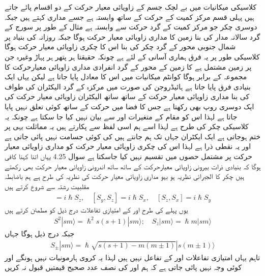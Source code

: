 کلاسیکی میکانیات میں بے لچک جسم کے زاویائی معیار حرکت کے دو اقسام پائے جاتے ہیں پہلی قسم مرکز کمیت کے حرکت کے ساتھ وابستہ ہے جسے مداری  کہتے ہیں جبکہ دوسری چکر  جو مرکز کمیت کے گرد حرکت سے وابستہ ہے مثال کے طور پر سورج کے گرد سالانہ مدار کی بنا زمین کا مداری زاویائی معیار حرکت ہوگا جبکہ روزانہ کی بنیاد پر شمال جنوبی محور کے گرد چکر کی بنا اس کا چکری زاویائی معیار حرکت ہوگا کلاسیکی طور پر یہ فرق ہماری آسانی کے لئے ہے چونکہ حقیقتا ہر پتھر ہر پہاڑ وغیرہ جن پر زمین مشتمل ہے کا زمین کے محور کے گرد انفرادی مداری زاویائی معیارحرکت کا مجموعہ  کے برابر ہوگا کوانٹم میکانیات میں اس کا معادل پایا جاتا ہے لیکن یہاں ایک بنیادی فرق پایا جاتا ہے ہائیڈروجن کی صورت میں مرکزہ کے گرد الیکٹران کی طواف کی بنا مداری زاویائی معیار حرکت کے ساتھ ساتھ الیکٹران زاویائی معیار حرکت کی ایک دوسری روپ بھی رکھتا ہے جس کا فضا میں حرکت کے ساتھ کوئی تعلق نہیں پایا جاتا ہے لہذا اس کو مقام کے متغیرات   اور  سے بیان نہیں کیا جا سکتا ہے چونکہ یہ کلاسیکی چکر کی طرح ہے لہذا اسے ہم اسی لفظ سے پکارتے ہیں یہ مماثلت یہی پر ختم ہوجاتی ہے ایک ایکٹران جہاں تک ہم جانتے ہیں کی کوئی جسامت نہیں پائی جاتی ہے اور یہ نقطی ذرا ہے لہذا اس کی چکری زاویائی معیار حرکت کو مداری زاویائی معیار حرکت پر مشتمل حصوں میں تقسیم نہیں کیا جاسکتا ہے سوال 4.25 یہاں اتنا کہنا کافی ہوگا کہ بنیادی ذرات بیرونی زاویائی معیارحرکت  کے ساتھ ساتھ اندرونی زاویائی معیار حرکت  بھی رکھتے ہیں چکر کا الجبرائی نظریہ ہو بہو مداری زاویائی معیار حرکت کی نظریہ کی طرح ہے ہم باضابطہ  مقلبیت رشتہ سے شروع کرتے ہیں 
\begin{align}
[S_x , S_y] = i \hslash S_z , \quad [S_y , S_z] = i \hslash S_x , \quad [S_z , S_x] = i \hslash S_y
\end{align}
یوں پہلے کی طرح  اور  کے امتیازی تفاعلات درج ذیل کو مطمئن کرتے ہیں 
\begin{align}
S^2 | s m \rangle = \hslash^2 s (s + 1) | s m \rangle ; \quad S_z | s m \rangle = \hslash m | s m \rangle
\end{align} 
جبکہ درج ذیل ہوگا جہاں  
\begin{align}
S_{\pm} | s m \rangle = \hslash \sqrt{s (s + 1) - m (m \pm 1)} | s (m \pm 1) \rangle
\end{align}
تاہم یہاں امتیازی تفاعلات  اور  کے تفاعل نہیں ہیں لہذا یہ کروی ہارمونیات نہیں ہونگے اور کوئی وجہ نہیں پائی جاتی ہے کہ ہم  اور  کی نصف عدد صحیح قیمتیں قبول نہ کریں 
